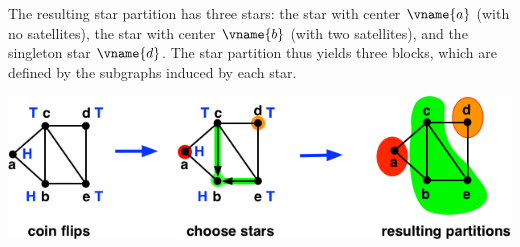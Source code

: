 \begin{flex}
\begin{example}
The resulting star partition has three stars: the star with center $\vname{a}$ (with no
satellites), the star with center $\vname{b}$ (with two satellites),
and the singleton star $\vname{d}$.
%
The star partition thus yields three blocks, which are defined by the
subgraphs induced by each star.

\begin{center}
  \includegraphics[width=6in]{./graph-contraction/media-star/star-find0.jpg}
\end{center}
\end{example}
\end{flex}

